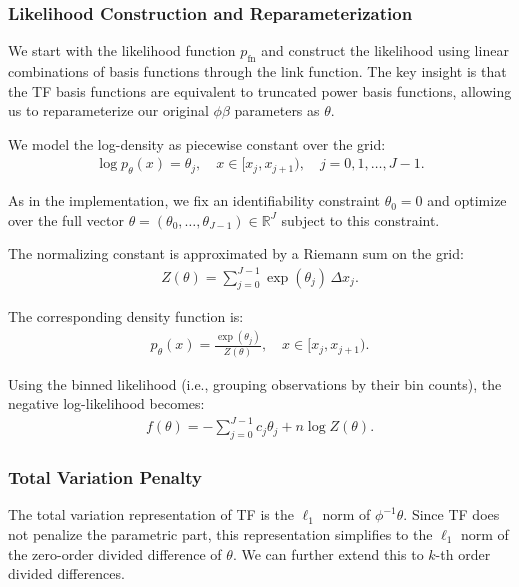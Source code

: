 \subsubsection{Likelihood Construction and Reparameterization}

We start with the likelihood function $p_{\text{fn}}$ and construct the likelihood using linear combinations of basis functions through the link function. The key insight is that the TF basis functions are equivalent to truncated power basis functions, allowing us to reparameterize our original $\phi \beta$ parameters as $\theta$.

We model the log-density as piecewise constant over the grid:
\begin{align*}
\log p_\theta(x) = \theta_j, \quad x \in [x_j, x_{j+1}), \quad j = 0, 1, \ldots, J-1.
\end{align*}

As in the implementation, we fix an identifiability constraint $\theta_0=0$ and optimize over the full vector $\theta=(\theta_0,\ldots,\theta_{J-1})\in\mathbb{R}^J$ subject to this constraint.

The normalizing constant is approximated by a Riemann sum on the grid:
\begin{align*}
Z(\theta) = \sum_{j=0}^{J-1} \exp(\theta_j)\,\Delta x_j.
\end{align*}

The corresponding density function is:
\begin{align*}
p_\theta(x) = \frac{\exp(\theta_j)}{Z(\theta)}, \quad x \in [x_j, x_{j+1}).
\end{align*}

Using the binned likelihood (i.e., grouping observations by their bin counts), the negative log-likelihood becomes:
\begin{align*}
f(\theta) = -\sum_{j=0}^{J-1} c_j \theta_j + n \log Z(\theta).
\end{align*}

\subsubsection{Total Variation Penalty}

The total variation representation of TF is the $\ell_1$ norm of $\phi^{-1} \theta$. Since TF does not penalize the parametric part, this representation simplifies to the $\ell_1$ norm of the zero-order divided difference of $\theta$. We can further extend this to $k$-th order divided differences.

